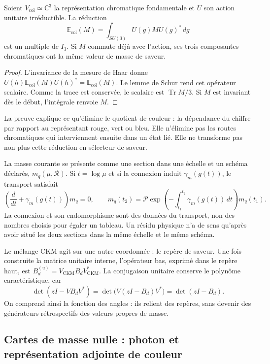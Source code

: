 \begin{proposition}
\label{vi:vi:prop:masa-color}
Soient \(V_{\mathrm{col}}\simeq\mathbb C^3\) la représentation chromatique
fondamentale et \(U\) son action unitaire irréductible. La réduction
\[
 \mathbb E_{\mathrm{col}}(M)=
 \int_{SU(3)}U(g)MU(g)^*\,dg
\]
est un multiple de \(I_3\). Si \(M\) commute déjà avec l’action, ses trois
composantes chromatiques ont la même valeur de masse de saveur.
\end{proposition}
\begin{proof}
L’invariance de la mesure de Haar donne
\(U(h)\mathbb E_{\mathrm{col}}(M)U(h)^*=
\mathbb E_{\mathrm{col}}(M)\). Le lemme de Schur rend cet
opérateur scalaire. Comme la trace est conservée, le scalaire est
\(\operatorname{Tr}M/3\). Si \(M\) est invariant dès le début,
l’intégrale renvoie \(M\).
\end{proof}

La preuve explique ce qu’élimine le quotient de couleur : la dépendance du
chiffre par rapport au représentant rouge, vert ou bleu. Elle n’élimine pas les
routes chromatiques qui interviennent ensuite dans un état lié. Elle ne
transforme pas non plus cette réduction en sélecteur de saveur.

La masse courante se présente comme une section dans une échelle et un schéma
déclarés, \(m_q(\mu,\mathscr R)\). Si \(t=\log\mu\) et si la connexion
induit \(\gamma_m(g(t))\), le transport satisfait
\[
 \left(\frac{d}{dt}+\gamma_m(g(t))\right)m_q=0,
 \qquad
 m_q(t_2)=\mathcal P\exp\left(-\int_{t_1}^{t_2}
 \gamma_m(g(t))\,dt\right)m_q(t_1).
\]
La connexion et son endomorphisme sont des données du transport, non des nombres
choisis pour égaler un tableau. Un résidu physique n’a de sens
qu’après avoir situé les deux sections dans la même échelle et le même schéma.

Le mélange CKM agit sur une autre coordonnée : le repère de saveur. Une fois
construite la matrice unitaire interne, l’opérateur bas, exprimé dans
le repère haut, est \(B_d^{(u)}=V_{\mathrm{CKM}}B_dV_{\mathrm{CKM}}^*\).
La conjugaison unitaire conserve le polynôme caractéristique, car
\[
 \det(zI-VB_dV^*)=\det\bigl(V(zI-B_d)V^*\bigr)=\det(zI-B_d).
\]
On comprend ainsi la fonction des angles : ils relient des repères, sans
devenir des générateurs rétrospectifs des valeurs propres de masse.

\subsection{Cartes de masse nulle : photon et représentation adjointe de couleur}
\label{vi:vi:subsec:nulo-familias}

